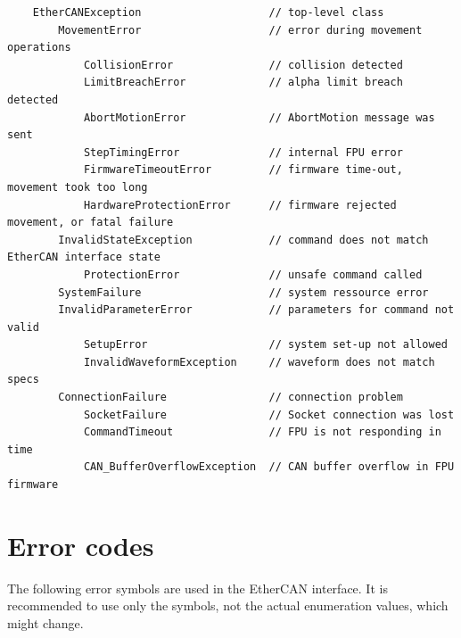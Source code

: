 \documentclass[fontsize=12,a4paper]{scrreprt}
\begin{document}
\begin{verbatim}
    EtherCANException                    // top-level class
        MovementError                    // error during movement operations
            CollisionError               // collision detected
            LimitBreachError             // alpha limit breach detected
            AbortMotionError             // AbortMotion message was sent
            StepTimingError              // internal FPU error
            FirmwareTimeoutError         // firmware time-out, movement took too long
            HardwareProtectionError      // firmware rejected movement, or fatal failure
        InvalidStateException            // command does not match EtherCAN interface state
            ProtectionError              // unsafe command called
        SystemFailure                    // system ressource error
        InvalidParameterError            // parameters for command not valid
            SetupError                   // system set-up not allowed
            InvalidWaveformException     // waveform does not match specs
        ConnectionFailure                // connection problem
            SocketFailure                // Socket connection was lost
            CommandTimeout               // FPU is not responding in time
            CAN_BufferOverflowException  // CAN buffer overflow in FPU firmware

\end{verbatim}

\section{Error codes}
\label{sec:errorcodes}

The following error symbols are used in the EtherCAN interface.  It is recommended
to use only the symbols, not the actual enumeration values, which
might change.
\end{document}
